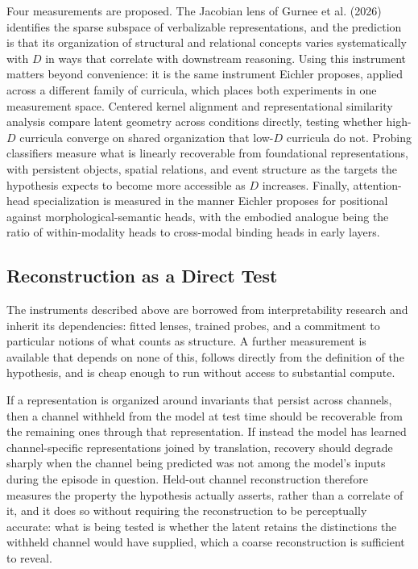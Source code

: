 \documentclass[11pt]{article}
\begin{document}
Four measurements are proposed. The Jacobian lens of Gurnee et al. (2026) identifies the sparse subspace of verbalizable representations, and the prediction is that its organization of structural and relational concepts varies systematically with $D$ in ways that correlate with downstream reasoning. Using this instrument matters beyond convenience: it is the same instrument Eichler proposes, applied across a different family of curricula, which places both experiments in one measurement space. Centered kernel alignment and representational similarity analysis compare latent geometry across conditions directly, testing whether high-$D$ curricula converge on shared organization that low-$D$ curricula do not. Probing classifiers measure what is linearly recoverable from foundational representations, with persistent objects, spatial relations, and event structure as the targets the hypothesis expects to become more accessible as $D$ increases. Finally, attention-head specialization is measured in the manner Eichler proposes for positional against morphological-semantic heads, with the embodied analogue being the ratio of within-modality heads to cross-modal binding heads in early layers.

\subsection{Reconstruction as a Direct Test}

The instruments described above are borrowed from interpretability research and inherit its dependencies: fitted lenses, trained probes, and a commitment to particular notions of what counts as structure. A further measurement is available that depends on none of this, follows directly from the definition of the hypothesis, and is cheap enough to run without access to substantial compute.

If a representation is organized around invariants that persist across channels, then a channel withheld from the model at test time should be recoverable from the remaining ones through that representation. If instead the model has learned channel-specific representations joined by translation, recovery should degrade sharply when the channel being predicted was not among the model's inputs during the episode in question. Held-out channel reconstruction therefore measures the property the hypothesis actually asserts, rather than a correlate of it, and it does so without requiring the reconstruction to be perceptually accurate: what is being tested is whether the latent retains the distinctions the withheld channel would have supplied, which a coarse reconstruction is sufficient to reveal.
\end{document}
